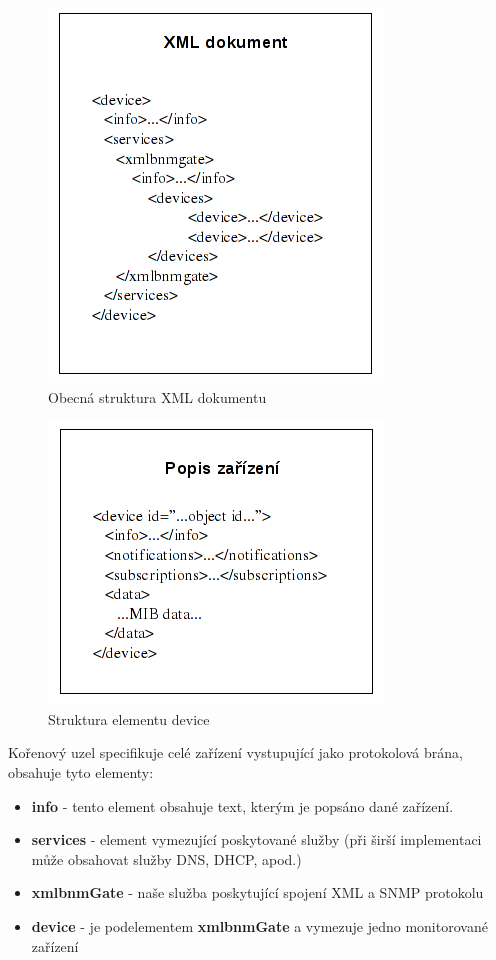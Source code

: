 \begin{figure}[htp]
	\begin{center}
		\includegraphics{obrazky/04_schema_dokumentu.png}
		\caption{Obecná struktura XML dokumentu}
		\label{obr_an_strom_struktura}
	\end{center}
\end{figure}

\begin{figure}[htp]
	\begin{center}
		\includegraphics{obrazky/04_schema_device.png}
		\caption{Struktura elementu device}
		\label{obr_an_device_struktura}
	\end{center}
\end{figure}

Kořenový uzel specifikuje celé zařízení vystupující jako protokolová brána, obsahuje tyto elementy:
\begin{itemize}
	\item \textbf{info} - tento element obsahuje text, kterým je popsáno dané zařízení.
	\item \textbf{services} - element vymezující poskytované služby (při širší implementaci může obsahovat služby DNS, DHCP, apod.)
	\item \textbf{xmlbnmGate} - naše služba poskytující spojení XML a SNMP protokolu
	\item \textbf{device} - je podelementem \textbf{xmlbnmGate} a vymezuje jedno monitorované zařízení
\end{itemize}


